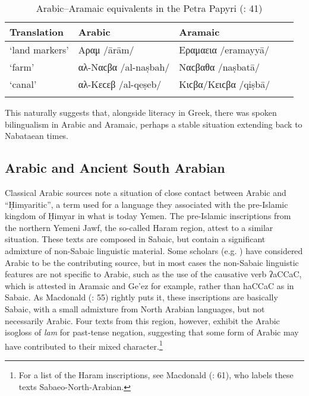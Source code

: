 \documentclass[output=paper]{langsci/langscibook}
\begin{document}
\begin{table}
\caption{Arabic--Aramaic equivalents in the Petra Papyri (\citealt{Al-Jallad2018Petra}: 41)}
\label{tab:Petra}
\begin{tabular}{lllll}
\lsptoprule
Translation & Arabic & Aramaic \\
\midrule
`land markers' & \multicolumn{1}{l}{Αραμ /ārām/} & \multicolumn{1}{l}{Εραμαεια /eramayyā/}  \\
`farm' & \multicolumn{1}{l}{αλ-Ναϲβα /al-naṣbah/} & \multicolumn{1}{l}{Ναϲβαθα /naṣbatā/}  \\
`canal' & \multicolumn{1}{l}{αλ-Κεϲεβ /al-qeṣeb/} & \multicolumn{1}{l}{Κιϲβα/Κειϲβα /qiṣbā/}  \\
\lspbottomrule
\end{tabular}
\end{table}

This naturally suggests that, alongside literacy in Greek, there was spoken bilingualism in Arabic and Aramaic, perhaps a stable situation extending back to Nabataean times. 

\subsection{Arabic and Ancient South Arabian}
Classical Arabic sources note a situation of close contact between Arabic and “Ḥimyaritic”, a term used for a language they associated with the pre-Islamic kingdom of Ḥimyar in what is today Yemen. The pre-Islamic inscriptions from the northern Yemeni Jawf, the so-called Haram region, attest to a similar situation. These texts are composed in Sabaic, but contain a significant admixture of non-Sabaic linguistic material. Some scholars (e.g. \citealt{Robin1991}) have considered Arabic to be the contributing source, but in most cases the non-Sabaic linguistic features are not specific to Arabic, such as the use of the causative verb ʔaCCaC, which is attested in Aramaic and Ge’ez for example, rather than haCCaC as in Sabaic. As Macdonald (\citeyear{Macdonald2000}: 55) rightly puts it, these inscriptions are basically Sabaic, with a small admixture from North Arabian languages, but not necessarily Arabic. Four texts from this region, however, exhibit the Arabic isogloss of \textit{lam} for past-tense negation, suggesting that some form of Arabic may have contributed to their mixed character.\footnote{For a list of the Haram inscriptions, see Macdonald (\citeyear{Macdonald2000}: 61), who labels these texts Sabaeo-North-Arabian.}   
\end{document}
